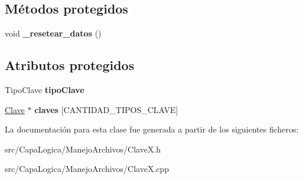 \subsection*{\-Métodos protegidos}
\begin{DoxyCompactItemize}
\item 
\hypertarget{class_clave_x_a6604b1baddf0d097871822b3474994ff}{void {\bfseries \-\_\-resetear\-\_\-datos} ()}\label{class_clave_x_a6604b1baddf0d097871822b3474994ff}

\end{DoxyCompactItemize}
\subsection*{\-Atributos protegidos}
\begin{DoxyCompactItemize}
\item 
\hypertarget{class_clave_x_ada3cf9ccf71164c4788f7e02bf64caf9}{\-Tipo\-Clave {\bfseries tipo\-Clave}}\label{class_clave_x_ada3cf9ccf71164c4788f7e02bf64caf9}

\item 
\hypertarget{class_clave_x_a6ed97b5e417ed500b5ecaf3ccf992092}{\hyperlink{class_clave}{\-Clave} $\ast$ {\bfseries claves} \mbox{[}\-C\-A\-N\-T\-I\-D\-A\-D\-\_\-\-T\-I\-P\-O\-S\-\_\-\-C\-L\-A\-V\-E\mbox{]}}\label{class_clave_x_a6ed97b5e417ed500b5ecaf3ccf992092}

\end{DoxyCompactItemize}


\-La documentación para esta clase fue generada a partir de los siguientes ficheros\-:\begin{DoxyCompactItemize}
\item 
src/\-Capa\-Logica/\-Manejo\-Archivos/\-Clave\-X.\-h\item 
src/\-Capa\-Logica/\-Manejo\-Archivos/\-Clave\-X.\-cpp\end{DoxyCompactItemize}
